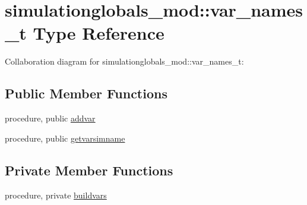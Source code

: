 \hypertarget{structsimulationglobals__mod_1_1var__names__t}{}\section{simulationglobals\+\_\+mod\+:\+:var\+\_\+names\+\_\+t Type Reference}
\label{structsimulationglobals__mod_1_1var__names__t}


Collaboration diagram for simulationglobals\+\_\+mod\+:\+:var\+\_\+names\+\_\+t\+:
\subsection*{Public Member Functions}
\begin{DoxyCompactItemize}
\item 
procedure, public \mbox{\hyperlink{structsimulationglobals__mod_1_1var__names__t_ad8f0446f28faf00796d4952116484509}{addvar}}
\item 
procedure, public \mbox{\hyperlink{structsimulationglobals__mod_1_1var__names__t_a6c6e9ecef4ab851c104348393a5ba9ec}{getvarsimname}}
\end{DoxyCompactItemize}
\subsection*{Private Member Functions}
\begin{DoxyCompactItemize}
\item 
procedure, private \mbox{\hyperlink{structsimulationglobals__mod_1_1var__names__t_a9a30996df58e3c94b86e6661291f4305}{buildvars}}
\end{DoxyCompactItemize}
